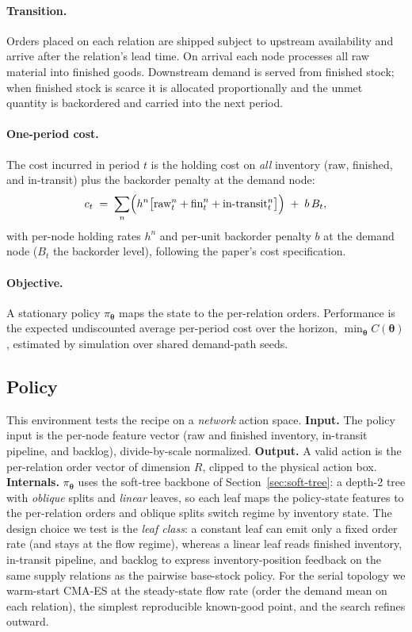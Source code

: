 \documentclass[11pt]{article}
\newcommand{\btheta}{\boldsymbol{\theta}}
\begin{document}
\paragraph{Transition.}
Orders placed on each relation are shipped subject to upstream availability and arrive after the
relation's lead time. On arrival each node processes all raw material into finished goods. Downstream
demand is served from finished stock; when finished stock is scarce it is allocated proportionally and
the unmet quantity is backordered and carried into the next period.

\paragraph{One-period cost.}
The cost incurred in period $t$ is the holding cost on \emph{all} inventory (raw, finished, and
in-transit) plus the backorder penalty at the demand node:
\begin{equation}
    \label{eq:pirhoo-cost}
    c_t \;=\; \sum_{n}\Bigl(h^{n}\bigl[\text{raw}^{n}_t+\text{fin}^{n}_t+\text{in-transit}^{n}_t\bigr]\Bigr) \;+\; b\,B_t ,
\end{equation}
with per-node holding rates $h^{n}$ and per-unit backorder penalty $b$ at the demand node ($B_t$ the
backorder level), following the paper's cost specification.

\paragraph{Objective.}
A stationary policy $\pi_{\btheta}$ maps the state to the per-relation orders. Performance is the
expected undiscounted average per-period cost over the horizon, $\min_{\btheta} C(\btheta)$, estimated
by simulation over shared demand-path seeds.

\FloatBarrier

\subsection{Policy}
\label{sec:pirhoo-policy}

This environment tests the recipe on a \emph{network} action space. \textbf{Input.} The policy input
is the per-node feature vector (raw and finished inventory, in-transit pipeline, and backlog),
divide-by-scale normalized. \textbf{Output.} A valid action is the per-relation order vector of
dimension $R$, clipped to the physical action box.
\textbf{Internals.} $\pi_{\btheta}$ uses the soft-tree backbone of Section~\ref{sec:soft-tree}: a
depth-2 tree with \emph{oblique} splits and \emph{linear} leaves, so each leaf maps the policy-state
features to the per-relation orders and oblique splits switch regime by inventory state. The design
choice we test is the \emph{leaf class}: a constant leaf can emit only a fixed order rate (and stays
at the flow regime), whereas a linear leaf reads finished inventory, in-transit pipeline, and backlog
to express inventory-position feedback on the same supply relations as the pairwise base-stock policy.
For the serial topology we warm-start CMA-ES at the steady-state flow rate (order the demand mean on
each relation), the simplest reproducible known-good point, and the search refines outward.
\end{document}

